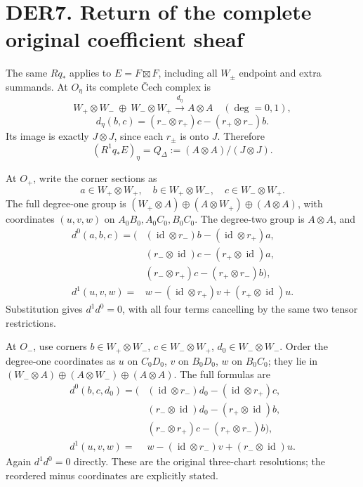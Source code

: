 \section{DER7. Return of the complete original coefficient
sheaf}\label{der7.-return-of-the-complete-original-coefficient-sheaf}

The same \(Rq_*\) applies to \(E=F\boxtimes F\), including all \(W_\pm\)
endpoint and extra summands. At \(O_\eta\) its complete Čech complex is
\[
W_+\otimes W_-\ \oplus\ W_-\otimes W_+
 \xrightarrow{d_\eta} A\otimes A
\quad(\deg=0,1),
\] \[
d_\eta(b,c)=(r_-\otimes r_+)c-(r_+\otimes r_-)b.
\tag{DER7.1}
\] Its image is exactly \(J\otimes J\), since each \(r_\pm\) is onto
\(J\). Therefore \[
(R^1q_*E)_\eta=Q_\Delta:=(A\otimes A)/(J\otimes J).
\tag{DER7.2}
\]

At \(O_+\), write the corner sections as \[
a\in W_+\otimes W_+,\quad
b\in W_+\otimes W_-,\quad
c\in W_-\otimes W_+.
\] The full degree-one group is
\((W_+\otimes A)\oplus(A\otimes W_+)\oplus(A\otimes A)\), with
coordinates \((u,v,w)\) on \(A_0B_0,A_0C_0,B_0C_0\). The degree-two
group is \(A\otimes A\), and \[
\begin{aligned}
d^0(a,b,c)=\bigl(&(\operatorname{id}\otimes r_-)b
                   -(\operatorname{id}\otimes r_+)a,\\
                &(r_-\otimes\operatorname{id})c
                   -(r_+\otimes\operatorname{id})a,\\
                &(r_-\otimes r_+)c-(r_+\otimes r_-)b\bigr),\\
d^1(u,v,w)={}&w-(\operatorname{id}\otimes r_+)v
                  +(r_+\otimes\operatorname{id})u.
\end{aligned}
\tag{DER7.3}
\] Substitution gives \(d^1d^0=0\), with all four terms cancelling by
the same two tensor restrictions.

At \(O_-\), use corners \(b\in W_+\otimes W_-\),
\(c\in W_-\otimes W_+\), \(d_0\in W_-\otimes W_-\). Order the degree-one
coordinates as \(u\) on \(C_0D_0\), \(v\) on \(B_0D_0\), \(w\) on
\(B_0C_0\); they lie in
\((W_-\otimes A)\oplus(A\otimes W_-)\oplus(A\otimes A)\). The full
formulas are \[
\begin{aligned}
d^0(b,c,d_0)=\bigl(&(\operatorname{id}\otimes r_-)d_0
                     -(\operatorname{id}\otimes r_+)c,\\
                 &(r_-\otimes\operatorname{id})d_0
                     -(r_+\otimes\operatorname{id})b,\\
                 &(r_-\otimes r_+)c-(r_+\otimes r_-)b\bigr),\\
d^1(u,v,w)={}&w-(\operatorname{id}\otimes r_-)v
                  +(r_-\otimes\operatorname{id})u .
\end{aligned}
\tag{DER7.4}
\] Again \(d^1d^0=0\) directly. These are the original three-chart
resolutions; the reordered minus coordinates are explicitly stated.

